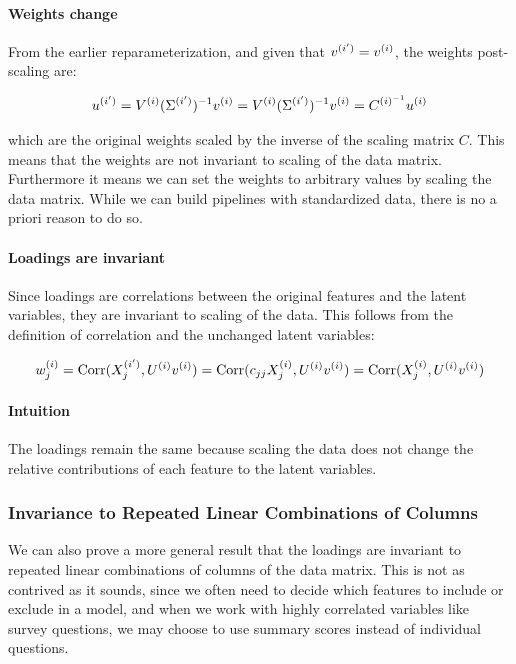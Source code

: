 \paragraph{Weights change}

From the earlier reparameterization, and given that $v^{(i')}=v^{(i)}$, the weights post-scaling are:

\begin{align}
    u^{(i')} = V^{(i)}(\Sigma^{(i')})^{-1}v^{(i)} = V^{(i)}(\Sigma^{(i')})^{-1}v^{(i)} = C^{{(i)}^{-1}}u^{(i)} \label{eq:weights_change}
\end{align}

which are the original weights scaled by the inverse of the scaling matrix \( C \). This means that the weights are not invariant to scaling of the data matrix. Furthermore it means we can set the weights to arbitrary values by scaling the data matrix.
While we can build pipelines with standardized data, there is no a priori reason to do so.

\paragraph{Loadings are invariant}

Since \gls{loadings} are correlations between the original features and the latent variables, they are invariant to scaling of the data.
This follows from the definition of correlation and the unchanged latent variables:

\begin{align}
    w^{(i)}_j = \operatorname{Corr}(X^{(i')}_j, U^{(i)}v^{(i)}) = \operatorname{Corr}(c_{jj}X^{(i)}_j, U^{(i)}v^{(i)}) = \operatorname{Corr}(X^{(i)}_j, U^{(i)}v^{(i)}) \label{eq:loading_invariant}
\end{align}

\paragraph{Intuition}
The \gls{loadings} remain the same because scaling the data does not change the relative contributions of each feature to the latent variables.

\subsubsection{Invariance to Repeated Linear Combinations of Columns}\label{subsubsec:invariance-to-linear-combinations}

We can also prove a more general result that the \gls{loadings} are invariant to repeated linear combinations of columns of the data matrix.
This is not as contrived as it sounds, since we often need to decide which features to include or exclude in a model, and when we work with highly correlated variables like survey questions, we may choose to use summary scores instead of individual questions.

